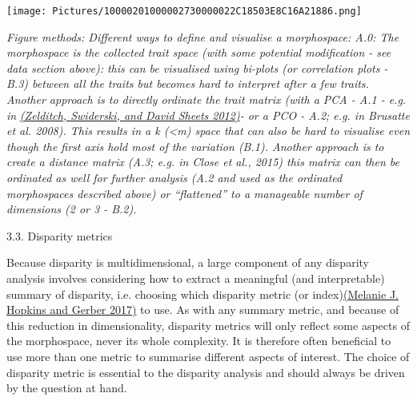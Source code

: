 \texttt{[image: Pictures/10000201000002730000022C18503E8C16A21886.png]}

\emph{Figure methods: Different ways to define and visualise a
morphospace: A.0: The morphospace is the collected trait space (with
some potential modification - see data section above): this can be
visualised using bi-plots (or correlation plots - B.3) between all the
traits but becomes hard to interpret after a few traits. Another
approach is to directly ordinate the trait matrix (with a PCA - A.1 -
e.g. in }\href{https://paperpile.com/c/sTGYvp/ZQS9}{\emph{(Zelditch,
Swiderski, and David Sheets 2012)}}\emph{- or a PCO - A.2; e.g. in
Brusatte et al. 2008). This results in a k (\textless{}m) space that can
also be hard to visualise even though the first axis hold most of the
variation (B.1). Another approach is to create a distance matrix (A.3;
e.g. in Close et al., 2015) this matrix can then be ordinated as well
for further analysis (A.2 and used as the ordinated morphospaces
described above) or ``flattened'' to a manageable number of dimensions
(2 or 3 - B.2).}

\protect\hypertarget{anchor-1}{}{}3.3. Disparity metrics

Because disparity is multidimensional, a large component of any
disparity analysis involves considering how to extract a meaningful (and
interpretable) summary of disparity, i.e. choosing which disparity
metric (or index)\href{https://paperpile.com/c/sTGYvp/vTHS}{(Melanie J.
Hopkins and Gerber 2017)} to use. As with any summary metric, and
because of this reduction in dimensionality, disparity metrics will only
reflect some aspects of the morphospace, never its whole complexity. It
is therefore often beneficial to use more than one metric to summarise
different aspects of interest. The choice of disparity metric is
essential to the disparity analysis and should always be driven by the
question at hand.

